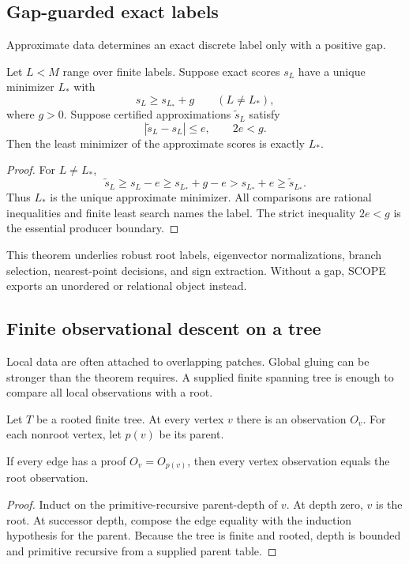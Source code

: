 \subsection{Gap-guarded exact labels}

Approximate data determines an exact discrete label only with a positive gap.

\begin{theorem}
Let \(L< M\) range over finite labels.  Suppose exact scores \(s_L\) have a unique minimizer \(L_*\) with
\[
  s_L\ge s_{L_*}+g\qquad(L\ne L_*),
\]
where \(g>0\).  Suppose certified approximations \(\tilde s_L\) satisfy
\[
  |\tilde s_L-s_L|\le e,
  \qquad 2e<g.
\]
Then the least minimizer of the approximate scores is exactly \(L_*\).
\end{theorem}
\begin{proof}
For \(L\ne L_*\),
\[
\tilde s_L\ge s_L-e\ge s_{L_*}+g-e
> s_{L_*}+e\ge\tilde s_{L_*}.
\]
Thus \(L_*\) is the unique approximate minimizer.  All comparisons are rational inequalities and finite least search names the label.  The strict inequality \(2e<g\) is the essential producer boundary.
\end{proof}

This theorem underlies robust root labels, eigenvector normalizations, branch selection, nearest-point decisions, and sign extraction.  Without a gap, SCOPE exports an unordered or relational object instead.

\subsection{Finite observational descent on a tree}

Local data are often attached to overlapping patches.  Global gluing can be stronger than the theorem requires.  A supplied finite spanning tree is enough to compare all local observations with a root.

Let \(T\) be a rooted finite tree.  At every vertex \(v\) there is an observation \(O_v\).  For each nonroot vertex, let \(p(v)\) be its parent.

\begin{theorem}
If every edge has a proof \(O_v=O_{p(v)}\), then every vertex observation equals the root observation.
\end{theorem}
\begin{proof}
Induct on the primitive-recursive parent-depth of \(v\).  At depth zero, \(v\) is the root.  At successor depth, compose the edge equality with the induction hypothesis for the parent.  Because the tree is finite and rooted, depth is bounded and primitive recursive from a supplied parent table.
\end{proof}

